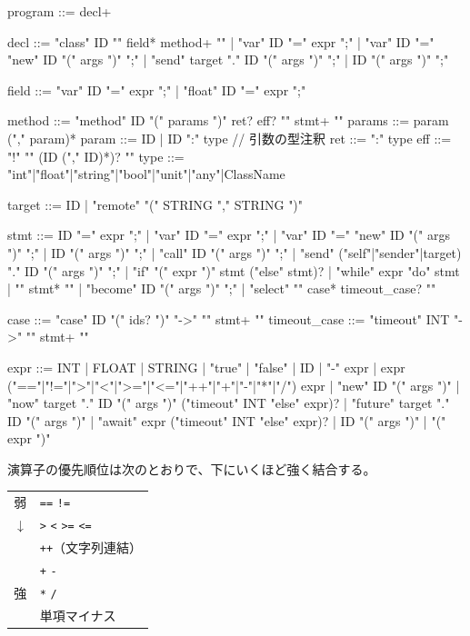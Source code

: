 \documentclass[11pt,a4paper]{ltjsarticle}
\theoremstyle{definition}
\theoremstyle{remark}
\begin{document}
\begin{term}
program    ::= decl+

decl       ::= "class" ID "{" field* method+ "}"
             | "var" ID "=" expr ";"
             | "var" ID "=" "new" ID "(" args ")" ";"
             | "send"  target "." ID "(" args ")" ";"
             | ID "(" args ")" ";"

field      ::= "var"   ID "=" expr ";"
             | "float" ID "=" expr ";"

method     ::= "method" ID "(" params ")" ret? eff? "{" stmt+ "}"
params     ::= param ("," param)*
param      ::= ID | ID ":" type            // 引数の型注釈
ret        ::= ":" type
eff        ::= "!" "{" (ID ("," ID)*)? "}"
type       ::= "int"|"float"|"string"|"bool"|"unit"|"any"|ClassName

target     ::= ID | "remote" "(" STRING "," STRING ")"

stmt       ::= ID "=" expr ";"
             | "var" ID "=" expr ";"
             | "var" ID "=" "new" ID "(" args ")" ";"
             | ID "(" args ")" ";"  |  "call" ID "(" args ")" ";"
             | "send" ("self"|"sender"|target) "." ID "(" args ")" ";"
             | "if" "(" expr ")" stmt ("else" stmt)?
             | "while" expr "do" stmt
             | "{" stmt* "}"
             | "become" ID "(" args ")" ";"
             | "select" "{" case* timeout_case? "}"

case         ::= "case" ID "(" ids? ")" "->" "{" stmt+ "}"
timeout_case ::= "timeout" INT "->" "{" stmt+ "}"

expr       ::= INT | FLOAT | STRING | "true" | "false" | ID
             | "-" expr
             | expr ("=="|"!="|">"|"<"|">="|"<="|"++"|"+"|"-"|"*"|"/") expr
             | "new" ID "(" args ")"
             | "now" target "." ID "(" args ")" ("timeout" INT "else" expr)?
             | "future" target "." ID "(" args ")"
             | "await" expr ("timeout" INT "else" expr)?
             | ID "(" args ")"  |  "(" expr ")"
\end{term}

演算子の優先順位は次のとおりで、下にいくほど強く結合する。

\begin{center}
\begin{tabular}{cl}
\toprule
弱 & \texttt{==} \quad \texttt{!=} \\
$\downarrow$ & \texttt{>} \quad \texttt{<} \quad \texttt{>=} \quad \texttt{<=} \\
 & \texttt{++}（文字列連結） \\
 & \texttt{+} \quad \texttt{-} \\
強 & \texttt{*} \quad \texttt{/} \\
   & 単項マイナス \\
\bottomrule
\end{tabular}
\end{center}
\end{document}
